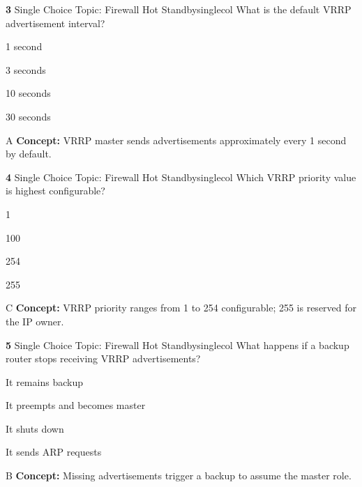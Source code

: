 \documentclass[10pt,a4paper]{article}
\begin{document}
\begin{qcard}{\color{white}\textbf{3} \hfill \small Single Choice \textbar{} Topic: Firewall Hot Standby}{singlecol}
What is the default VRRP advertisement interval?

\begin{qoptions}
\item 1 second
\item 3 seconds
\item 10 seconds
\item 30 seconds
\end{qoptions}
\begin{explainbox}{A}
\textbf{Concept:} VRRP master sends advertisements approximately every 1 second by default.
\end{explainbox}
\end{qcard}

\begin{qcard}{\color{white}\textbf{4} \hfill \small Single Choice \textbar{} Topic: Firewall Hot Standby}{singlecol}
Which VRRP priority value is highest configurable?

\begin{qoptions}
\item 1
\item 100
\item 254
\item 255
\end{qoptions}
\begin{explainbox}{C}
\textbf{Concept:} VRRP priority ranges from 1 to 254 configurable; 255 is reserved for the IP owner.
\end{explainbox}
\end{qcard}

\begin{qcard}{\color{white}\textbf{5} \hfill \small Single Choice \textbar{} Topic: Firewall Hot Standby}{singlecol}
What happens if a backup router stops receiving VRRP advertisements?

\begin{qoptions}
\item It remains backup
\item It preempts and becomes master
\item It shuts down
\item It sends ARP requests
\end{qoptions}
\begin{explainbox}{B}
\textbf{Concept:} Missing advertisements trigger a backup to assume the master role.
\end{explainbox}
\end{qcard}
\end{document}
